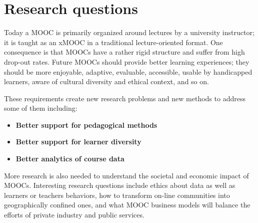\documentclass[a4paper,UKenglish]{dagman}
\begin{document}
\section{Research questions}
Today a MOOC is primarily organized around lectures by a university instructor; it is taught as an
xMOOC in a traditional lecture-oriented format. One consequence is that MOOCs have a rather rigid
structure and suffer from high drop-out rates.  Future MOOCs should provide better learning
experiences; they should be more enjoyable, adaptive, evaluable, accessible, usable by handicapped
learners, aware of cultural diversity and ethical context, and so on.

These requirements create new research problems and new methods to address some of them including:
 
\begin{itemize}
\item \textbf{Better support for pedagogical methods}
\item \textbf{Better support for learner diversity}
\item \textbf{Better analytics of course data}

\end{itemize}

More research is also needed to understand the societal and economic impact of MOOCs. Interesting
research questions include ethics about data as well as learners or teachers behaviors, how to
transform on-line communities into geographically confined ones, and what MOOC business models will
balance the efforts of private industry and public services.


  
  
\end{document}
